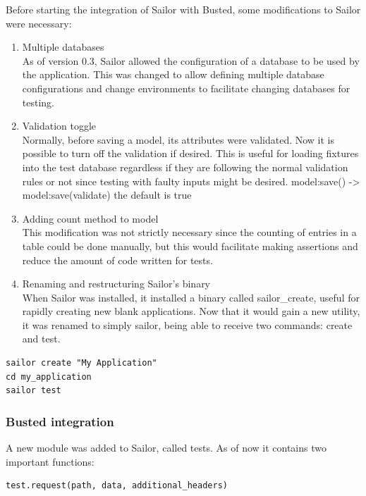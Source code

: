 \documentclass{article}
\begin{document}
Before starting the integration of Sailor with Busted, some modifications to Sailor were necessary:\\

\begin{enumerate}\item Multiple databases\\
As of version 0.3, Sailor allowed the configuration of a database to be used by the application. This was changed to allow defining multiple database configurations and change environments to facilitate changing databases for testing.

\item Validation toggle \\
Normally, before saving a model, its attributes were validated. Now it is possible to turn off the validation if desired. This is useful for loading fixtures into the test database regardless if they are following the normal validation rules or not since testing with faulty inputs might be desired.
model:save() -> model:save(validate)
the default is true

\item Adding count method to model \\
This modification was not strictly necessary since the counting of entries in a table could be done manually, but this would facilitate making assertions and reduce the amount of code written for tests.

\item Renaming and restructuring Sailor's binary\\
When Sailor was installed, it installed a binary called sailor\_create, useful for rapidly creating new blank applications. Now that it would gain a new utility, it was renamed to simply sailor, being able to receive two commands: create and test.
\end{enumerate}

\lstset{language=Bash}    
\begin{lstlisting}[frame=single]
sailor create "My Application"
cd my_application
sailor test
\end{lstlisting}


\subsubsection{Busted integration}

A new module was added to Sailor, called tests. As of now it contains two important functions:

\lstset{language=Lua}    
\begin{lstlisting}[frame=single]
test.request(path, data, additional_headers)
\end{lstlisting}
\end{document}
